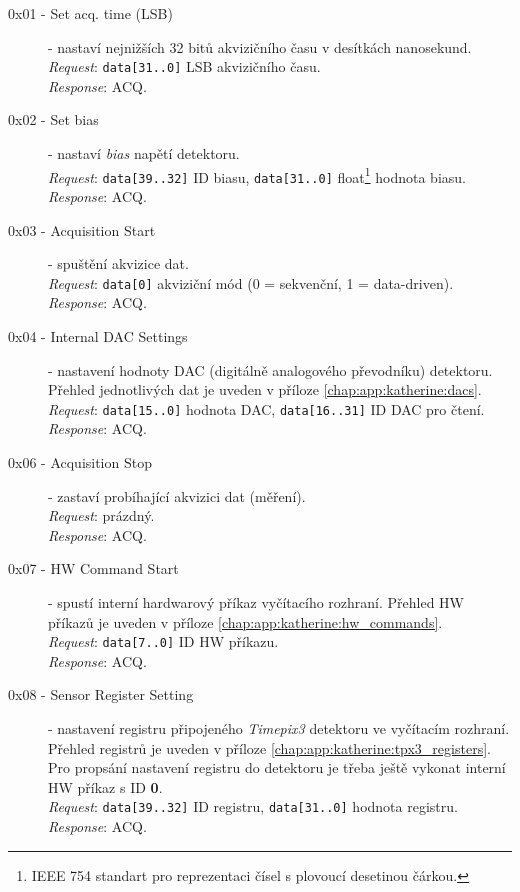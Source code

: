 \begin{description}
    \item[0x01 - Set acq. time (LSB)] - nastaví nejnižších 32 bitů akvizičního času v desítkách nanosekund.
    \\\textit{Request}: \texttt{data[31..0]} LSB akvizičního času.
    \\\textit{Response}: ACQ.

    \item[0x02 - Set bias] - nastaví \textit{bias} napětí detektoru.
    \\\textit{Request}: \texttt{data[39..32]} ID biasu, \texttt{data[31..0]} float\footnote{IEEE 754 standart pro reprezentaci čísel s plovoucí desetinou čárkou.} hodnota biasu.
    \\\textit{Response}: ACQ.
    
    \item[0x03 - Acquisition Start] - spuštění akvizice dat.
    \\\textit{Request}: \texttt{data[0]} akviziční mód (0 = sekvenční, 1 = data-driven).
    \\\textit{Response}: ACQ.
    
    \item[0x04 - Internal DAC Settings] - nastavení hodnoty DAC (digitálně analogového převodníku) detektoru. Přehled jednotlivých dat je uveden v příloze \ref{chap:app:katherine:dacs}.
    \\\textit{Request}: \texttt{data[15..0]} hodnota DAC, \texttt{data[16..31]} ID DAC pro čtení.
    \\\textit{Response}: ACQ.

    
    \item[0x06 - Acquisition Stop] - zastaví probíhající akvizici dat (měření).
    \\\textit{Request}: prázdný.
    \\\textit{Response}: ACQ.
    
    \item[0x07 - HW Command Start] - spustí interní hardwarový příkaz vyčítacího rozhraní. Přehled HW příkazů je uveden v příloze \ref{chap:app:katherine:hw_commands}.
    \\\textit{Request}: \texttt{data[7..0]} ID HW příkazu.
    \\\textit{Response}: ACQ.

    \item[0x08 - Sensor Register Setting] - nastavení registru připojeného \textit{Timepix3} detektoru ve vyčítacím rozhraní. Přehled registrů je uveden v příloze \ref{chap:app:katherine:tpx3_registers}. Pro propsání nastavení registru do detektoru je třeba ještě vykonat interní HW příkaz s ID \textbf{0}.
    \\\textit{Request}: \texttt{data[39..32]} ID registru, \texttt{data[31..0]} hodnota registru.
    \\\textit{Response}: ACQ.
    

\end{description}
